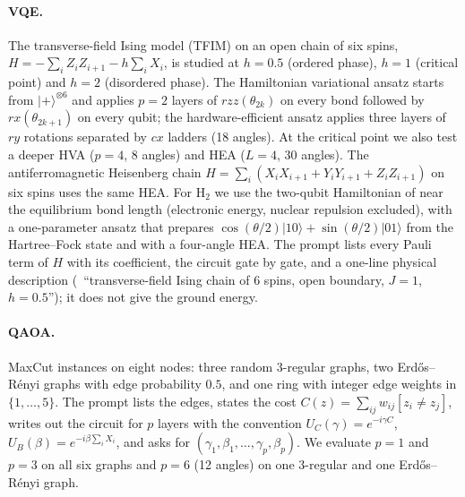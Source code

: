 \paragraph{VQE.}
The transverse-field Ising model (TFIM) on an open chain of six spins, $H = -\sum_i Z_i Z_{i+1} - h\sum_i X_i$, is studied at $h = 0.5$ (ordered phase), $h = 1$ (critical point) and $h = 2$ (disordered phase). The Hamiltonian variational ansatz starts from $|{+}\rangle^{\otimes 6}$ and applies $p = 2$ layers of $rzz(\theta_{2k})$ on every bond followed by $rx(\theta_{2k+1})$ on every qubit; the hardware-efficient ansatz applies three layers of $ry$ rotations separated by $cx$ ladders (18 angles). At the critical point we also test a deeper HVA ($p = 4$, 8 angles) and HEA ($L = 4$, 30 angles). The antiferromagnetic Heisenberg chain $H = \sum_i (X_iX_{i+1} + Y_iY_{i+1} + Z_iZ_{i+1})$ on six spins uses the same HEA. For H$_2$ we use the two-qubit Hamiltonian of \citet{omalley2016scalable} near the equilibrium bond length (electronic energy, nuclear repulsion excluded), with a one-parameter ansatz that prepares $\cos(\theta/2)|10\rangle + \sin(\theta/2)|01\rangle$ from the Hartree--Fock state and with a four-angle HEA. The prompt lists every Pauli term of $H$ with its coefficient, the circuit gate by gate, and a one-line physical description (\eg\ ``transverse-field Ising chain of 6 spins, open boundary, $J = 1$, $h = 0.5$''); it does not give the ground energy.

\paragraph{QAOA.}
MaxCut instances on eight nodes: three random 3-regular graphs, two Erd\H{o}s--R\'enyi graphs with edge probability $0.5$, and one ring with integer edge weights in $\{1, \ldots, 5\}$. The prompt lists the edges, states the cost $C(z) = \sum_{ij} w_{ij}[z_i \neq z_j]$, writes out the circuit for $p$ layers with the convention $U_C(\gamma) = e^{-i\gamma C}$, $U_B(\beta) = e^{-i\beta\sum_i X_i}$, and asks for $(\gamma_1, \beta_1, \ldots, \gamma_p, \beta_p)$. We evaluate $p = 1$ and $p = 3$ on all six graphs and $p = 6$ (12 angles) on one 3-regular and one Erd\H{o}s--R\'enyi graph.
